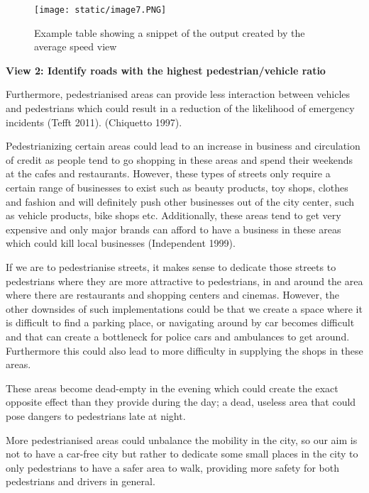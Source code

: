 \documentclass[format=acmsmall, review=false, screen=true]{acmart}
\begin{document}
\begin{figure}[H]
  \texttt{[image: static/image7.PNG]}
  \caption{Example table showing a snippet of the output created by the average speed view}
  \label{fig:verticalpartitioning-diagram}
\end{figure}

\textbf{View 2: Identify roads with the highest pedestrian/vehicle ratio}

Furthermore, pedestrianised areas can provide less interaction between vehicles and pedestrians which could result in a reduction of the likelihood of emergency incidents (Tefft 2011).  (Chiquetto 1997).

Pedestrianizing certain areas could lead to an increase in business and circulation of credit as people tend to go shopping in these areas and spend their weekends at the cafes and restaurants. However, these types of streets only require a certain range of businesses to exist such as beauty products, toy shops, clothes and fashion and will definitely push other businesses out of the city center, such as vehicle products, bike shops etc. Additionally, these areas tend to get very expensive and only major brands can afford to have a business in these areas which could kill local businesses (Independent 1999).

If we are to pedestrianise streets, it makes sense to dedicate those streets to pedestrians where they are more attractive to pedestrians, in and around the area where there are restaurants and shopping centers and cinemas. However, the other downsides of such implementations could be that we create a space where it is difficult to find a parking place, or navigating around by car becomes difficult and that can create a bottleneck for police cars and ambulances to get around. Furthermore this could also lead to more difficulty in supplying the shops in these areas.

These areas become dead-empty in the evening which could create the exact opposite effect than they provide during the day; a dead, useless area that could pose dangers to pedestrians late at night.

More pedestrianised areas could unbalance the mobility in the city, so our aim is not to have a car-free city but rather to dedicate some small places in the city to only pedestrians to have a safer area to walk, providing more safety for both pedestrians and drivers in general.
\end{document}
